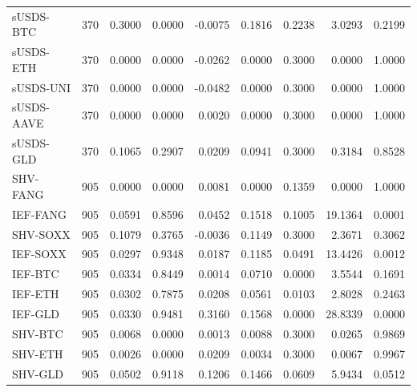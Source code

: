 \begin{tabular}{lrrrrrrrr}
sUSDS-BTC & 370 & 0.3000 & 0.0000 & -0.0075 & 0.1816 & 0.2238 & 3.0293 & 0.2199 \\
sUSDS-ETH & 370 & 0.0000 & 0.0000 & -0.0262 & 0.0000 & 0.3000 & 0.0000 & 1.0000 \\
sUSDS-UNI & 370 & 0.0000 & 0.0000 & -0.0482 & 0.0000 & 0.3000 & 0.0000 & 1.0000 \\
sUSDS-AAVE & 370 & 0.0000 & 0.0000 & 0.0020 & 0.0000 & 0.3000 & 0.0000 & 1.0000 \\
sUSDS-GLD & 370 & 0.1065 & 0.2907 & 0.0209 & 0.0941 & 0.3000 & 0.3184 & 0.8528 \\
SHV-FANG & 905 & 0.0000 & 0.0000 & 0.0081 & 0.0000 & 0.1359 & 0.0000 & 1.0000 \\
IEF-FANG & 905 & 0.0591 & 0.8596 & 0.0452 & 0.1518 & 0.1005 & 19.1364 & 0.0001 \\
SHV-SOXX & 905 & 0.1079 & 0.3765 & -0.0036 & 0.1149 & 0.3000 & 2.3671 & 0.3062 \\
IEF-SOXX & 905 & 0.0297 & 0.9348 & 0.0187 & 0.1185 & 0.0491 & 13.4426 & 0.0012 \\
IEF-BTC & 905 & 0.0334 & 0.8449 & 0.0014 & 0.0710 & 0.0000 & 3.5544 & 0.1691 \\
IEF-ETH & 905 & 0.0302 & 0.7875 & 0.0208 & 0.0561 & 0.0103 & 2.8028 & 0.2463 \\
IEF-GLD & 905 & 0.0330 & 0.9481 & 0.3160 & 0.1568 & 0.0000 & 28.8339 & 0.0000 \\
SHV-BTC & 905 & 0.0068 & 0.0000 & 0.0013 & 0.0088 & 0.3000 & 0.0265 & 0.9869 \\
SHV-ETH & 905 & 0.0026 & 0.0000 & 0.0209 & 0.0034 & 0.3000 & 0.0067 & 0.9967 \\
SHV-GLD & 905 & 0.0502 & 0.9118 & 0.1206 & 0.1466 & 0.0609 & 5.9434 & 0.0512 \\
\bottomrule
\end{tabular}
